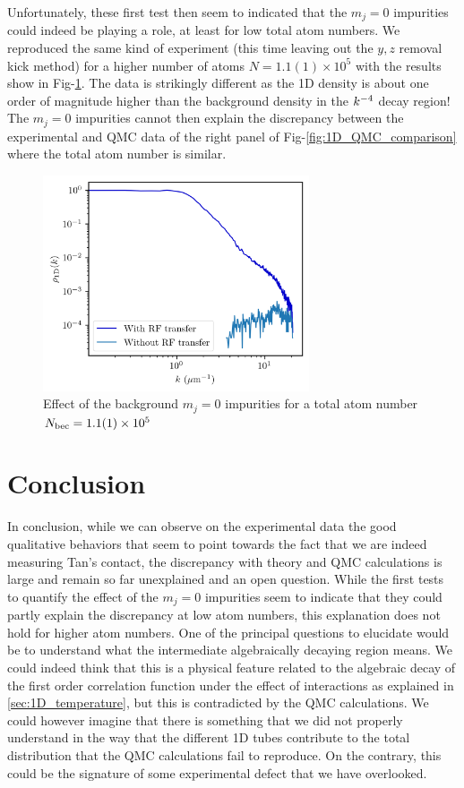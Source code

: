 Unfortunately, these first test then seem to indicated that the $m_j=0$ impurities could indeed be playing a role, at least for low total atom numbers. We reproduced the same kind of experiment (this time leaving out the $y,z$ removal kick method) for a higher number of atoms $N = 1.1(1) \times 10^5$ with the results show in Fig-\ref{fig:background_high_N}. The data is strikingly different as the 1D density is about one order of magnitude higher than the background density in the $k^{-4}$ decay region! The $m_j=0$ impurities cannot then explain the discrepancy between the experimental and QMC data of the right panel of Fig-\ref{fig:1D_QMC_comparison} where the total atom number is similar.

\begin{figure}
    \centering
    \includegraphics[width=0.7\textwidth]{Fig/Chapter5/1D_background_high.png}
    \caption[Effect of the background $m_j=0$ impurities for a total atom number $\NBEC=1.1(1) \times 10^5$]{Effect of the background $m_j=0$ impurities for a total atom number $\NBEC=1.1(1) \times 10^5$}
    \label{fig:background_high_N}
\end{figure}

\section{Conclusion}

In conclusion, while we can observe on the experimental data the good qualitative behaviors that seem to point towards the fact that we are indeed measuring Tan's contact, the discrepancy with theory and QMC calculations is large and remain so far unexplained and an open question. While the first tests to quantify the effect of the $m_j=0$ impurities seem to indicate that they could partly explain the discrepancy at low atom numbers, this explanation does not hold for higher atom numbers. One of the principal questions to elucidate would be to understand what the intermediate algebraically decaying region means. We could indeed think that this is a physical feature related to the algebraic decay of the first order correlation function under the effect of interactions as explained in \ref{sec:1D_temperature}, but this is contradicted by the QMC calculations. We could however imagine that there is something that we did not properly understand in the way that the different 1D tubes contribute to the total distribution that the QMC calculations fail to reproduce. On the contrary, this could be the signature of some experimental defect that we have overlooked. 

